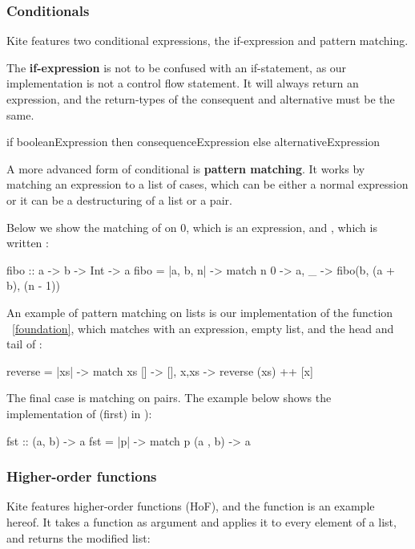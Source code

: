 \subsubsection{Conditionals}
\label{subsubsec:conditionals}
Kite features two conditional expressions, the if-expression and pattern matching.

The \textbf{if-expression} is not to be confused with an if-statement, as our implementation is not a control flow statement. It will always return an expression, and the return-types of the consequent and alternative must be the same.

\begin{kite}
if booleanExpression then consequenceExpression else alternativeExpression
\end{kite}

A more advanced form of conditional is \textbf{pattern matching}. It works by matching an expression to a list of cases, which can be either a normal expression or it can be a destructuring of a list or a pair.

Below we show the matching of  on 0, which is an expression, and , which is written :

\begin{kite}
fibo :: a -> b -> Int -> a
fibo = |a, b, n| -> {
    match n {
    0 -> a,
    _ -> fibo(b, (a + b), (n - 1))
    }
}
\end{kite}

An example of pattern matching on lists is our implementation of the function ~\ref{foundation}, which matches  with an expression, empty list, and the head and tail of :

\begin{kite}
reverse = |xs| -> {
  match xs {
    []    -> [],
    x,xs  -> reverse (xs) ++ [x]
  }
}
\end{kite}

The final case is matching on pairs. The example below shows the implementation of  (first) in ):
\begin{kite}
fst :: (a, b) -> a
fst = |p| -> {
  match p {
    (a , b) -> a
  }
}
\end{kite}

\subsubsection{Higher-order functions}
Kite features higher-order functions (HoF), and the  function is an example hereof. It takes a function as argument and applies it to every element of a list, and returns the modified list:

